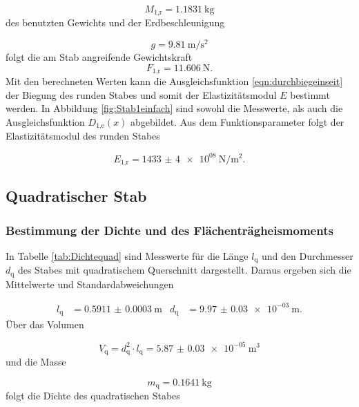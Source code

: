 \begin{equation}
  M_\text{1,r} = \SI{1.1831}{\kilo\gram}
\end{equation}
des benutzten Gewichts und der Erdbeschleunigung \cite{gWert}

\begin{equation}
  g = \SI{9.81}{\meter\per\second\squared}
  \label{eqn:Erdbeschl}
\end{equation}
folgt die am Stab angreifende Gewichtskraft
\begin{equation}
  F_\text{1,r} = \SI{11.606}{\newton}.
\end{equation}
Mit den berechneten Werten kann die Ausgleichsfunktion
\eqref{eqn:durchbiegeinseit} der Biegung
des runden Stabes und somit der Elastizitätsmodul $E$ bestimmt werden.
In Abbildung \ref{fig:Stab1einfach} sind sowohl die Messwerte, als auch die
Ausgleichsfunktion $D_\text{1,e}(x)$ abgebildet.
Aus dem Funktionsparameter folgt der Elastizitätsmodul des runden Stabes

\begin{equation}
  E_\text{1,r} = \SI{1433(4)e08}{\newton\per\meter\squared}.
\end{equation}

\subsection{Quadratischer Stab}

\subsubsection{Bestimmung der Dichte und des Flächenträgheismoments}

In Tabelle \ref{tab:Dichtequad} sind Messwerte für die Länge $l_\text{q}$ und
den Durchmesser $d_\text{q}$ des Stabes mit
quadratischem Querschnitt dargestellt.
Daraus ergeben sich die Mittelwerte und Standardabweichungen

\begin{align}
  l_\text{q} & = \SI{0.5911(3)}{\meter} & d_\text{q} & = \SI{9.97(3)e-03}{\meter}.
\end{align}
Über das Volumen

\begin{equation}
  V_\text{q} = d_\text{q}^2 \cdot l_\text{q} = \SI{5.87(3)e-05}{\cubic\meter}
\end{equation}
und die Masse

\begin{equation}
  m_\text{q} = \SI{0.1641}{\kilo\gram}
\end{equation}
folgt die Dichte des quadratischen Stabes

